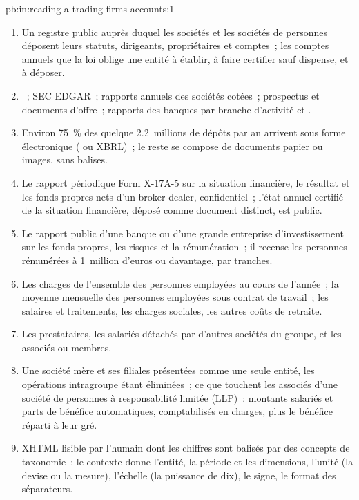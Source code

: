 \begin{solution}{pb:in:reading-a-trading-firms-accounts:1}
\begin{enumerate}
\item Un registre public auprès duquel les sociétés et les sociétés de personnes déposent leurs statuts, dirigeants, propriétaires et comptes~;
les comptes annuels que la loi oblige une entité à établir, à faire certifier sauf dispense, et à déposer.
\item {}~; SEC EDGAR~; rapports annuels des sociétés cotées~; prospectus et documents d'offre~; rapports des banques
par branche d'activité et .
\item Environ 75~\% des quelque 2.2~millions de dépôts par an arrivent sous forme électronique ( ou XBRL)~; le reste se compose de documents papier ou
images, sans balises.
\item Le rapport périodique Form X-17A-5 sur la situation financière, le résultat et les fonds propres nets d'un broker-dealer, confidentiel~;
l'état annuel certifié de la situation financière, déposé comme document distinct, est public.
\item Le rapport public d'une banque ou d'une grande entreprise d'investissement sur les fonds propres, les risques et la rémunération~; il recense les personnes
rémunérées à 1~million d'euros ou davantage, par tranches.
\item Les charges de l'ensemble des personnes employées au cours de l'année~; la moyenne mensuelle des personnes employées sous
contrat de travail~; les salaires et traitements, les charges sociales, les autres coûts de retraite.
\item Les prestataires, les salariés détachés par d'autres sociétés du groupe, et les associés ou membres.
\item Une société mère et ses filiales présentées comme une seule entité, les opérations intragroupe étant éliminées~; ce que touchent les associés
d'une société de personnes à responsabilité limitée (LLP)~: montants salariés et parts de bénéfice automatiques, comptabilisés en charges, plus le bénéfice réparti à leur
gré.
\item XHTML lisible par l'humain dont les chiffres sont balisés par des concepts de taxonomie~; le contexte donne l'entité, la période et
les dimensions, l'unité (la devise ou la mesure), l'échelle (la puissance de dix), le signe, le format des séparateurs.

\end{enumerate}
\end{solution}
